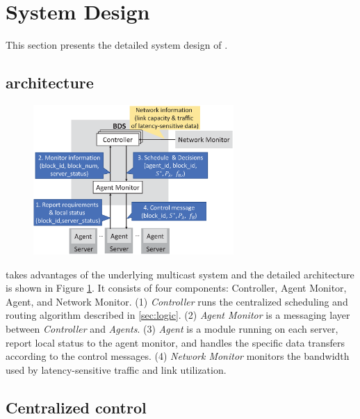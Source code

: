 \section{System Design}
\label{sec:system}

This section presents the detailed system design of \name.%

\subsection{\name architecture}
\label{subsec:system:architecture}

\begin{figure}[t]
  \centering
  \includegraphics[width=3in]{images/implementation_v2.eps}
  \label{fig:implementation}
\vspace{-0.4cm}
\end{figure}

\name takes advantages of the underlying multicast system and the detailed architecture is shown in Figure \ref{fig:implementation}. It consists of four components: Controller, Agent Monitor, Agent, and Network Monitor.
(1) \emph{Controller} runs the centralized scheduling and routing algorithm described in \Section\ref{sec:logic}.
(2) \emph{Agent Monitor} is a messaging layer between \emph{Controller} and \emph{Agents}.
(3) \emph{Agent} is a module running on each server, report local status to the agent monitor, and handles the specific data transfers according to the control messages.
(4) \emph{Network Monitor} monitors the bandwidth used by latency-sensitive traffic and link utilization.

\subsection{Centralized control}
\label{subsec:system:centralized}

